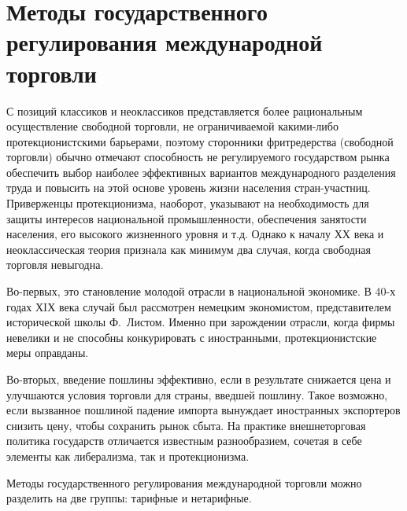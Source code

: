 \pagebreak %

\chapter{Методы государственного регулирования международной торговли}

С позиций классиков и неоклассиков представляется более рациональным
осуществление свободной торговли, не ограничиваемой какими-либо
протекционистскими барьерами, поэтому сторонники фритредерства (свободной
торговли) обычно отмечают способность не регулируемого государством рынка
обеспечить выбор наиболее эффективных вариантов международного разделения труда
и повысить на этой основе уровень жизни населения стран-участниц. Приверженцы
протекционизма, наоборот, указывают на необходимость для защиты интересов
национальной промышленности, обеспечения занятости населения, его высокого
жизненного уровня и т.д. Однако к началу ХХ века и неоклассическая теория
признала как минимум два случая, когда свободная торговля невыгодна.

Во-первых, это становление молодой отрасли в национальной экономике. В 40-х
годах ХIХ века случай был рассмотрен немецким экономистом, представителем
исторической школы Ф.~Листом. Именно при зарождении отрасли, когда фирмы
невелики и не способны конкурировать с иностранными, протекционистские меры
оправданы.

Во-вторых, введение пошлины эффективно, если в результате снижается цена и
улучшаются условия торговли для страны, введшей пошлину. Такое возможно, если
вызванное пошлиной падение импорта вынуждает иностранных экспортеров снизить
цену, чтобы сохранить рынок сбыта. На практике внешнеторговая политика
государств отличается известным разнообразием, сочетая в себе элементы как
либерализма, так и протекционизма.

Методы государственного регулирования международной торговли можно разделить на
две группы: тарифные и нетарифные.

